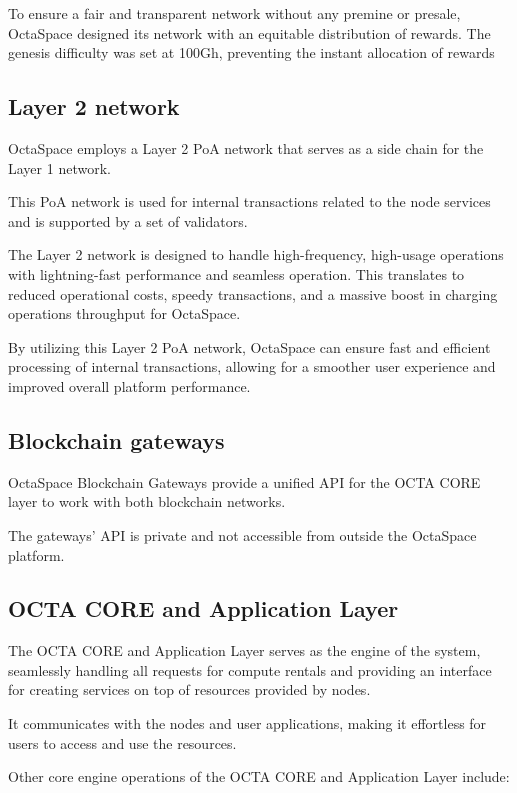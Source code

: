 To ensure a fair and transparent network without any premine or presale, OctaSpace designed its network with an equitable distribution of rewards. The genesis difficulty was set at 100Gh, preventing the instant allocation of rewards

\subsection{Layer 2 network}

OctaSpace employs a Layer 2 PoA network that serves as a side chain for the Layer 1 network.

This PoA network is used for internal transactions related to the node services and is supported by a set of validators.

The Layer 2 network is designed to handle high-frequency, high-usage operations with lightning-fast performance and seamless operation.
This translates to reduced operational costs, speedy transactions, and a massive boost in charging operations throughput for OctaSpace.

By utilizing this Layer 2 PoA network, OctaSpace can ensure fast and efficient processing of internal transactions, allowing for a smoother user experience and improved overall platform performance.


\subsection{Blockchain gateways}


OctaSpace Blockchain Gateways provide a unified API for the OCTA CORE layer to work with both blockchain networks.

The gateways' API is private and not accessible from outside the OctaSpace platform.

\subsection{OCTA CORE and Application Layer}

The OCTA CORE and Application Layer serves as the engine of the system, seamlessly handling all requests for compute rentals and providing an interface for creating services on top of resources provided by nodes.

It communicates with the nodes and user applications, making it effortless for users to access and use the resources.

Other core engine operations of the OCTA CORE and Application Layer include:

